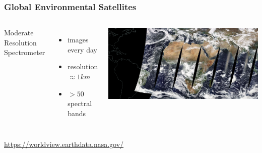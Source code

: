 \begin{frame}
	\frametitle{Global Environmental Satellites}
	
	\begin{columns}
		
		Moderate Resolution Spectrometer
		\begin{itemize}
			\item images every day
			\item resolution $\approx 1km$
			\item $> 50$ spectral bands
		\end{itemize}
		
		
		\includegraphics[width=\textwidth]{images/modis}
		
	\end{columns}
	
	\url{https://worldview.earthdata.nasa.gov/}
	
\end{frame}

